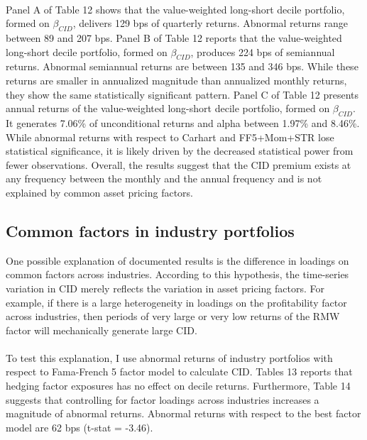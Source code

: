 \documentclass[12pt]{article}
\begin{document}
\paragraph{}
Panel A of Table 12 shows that the value-weighted long-short decile portfolio, formed on $\beta_{CID}$, delivers 129 bps of quarterly returns. Abnormal returns range between 89 and 207 bps. Panel B of Table 12 reports that the value-weighted long-short decile portfolio, formed on $\beta_{CID}$, produces 224 bps of semiannual returns. Abnormal semiannual returns are between 135 and 346 bps. While these returns are smaller in annualized magnitude than annualized monthly returns, they show the same statistically significant pattern. Panel C of Table 12 presents annual returns of the value-weighted long-short decile portfolio, formed on $\beta_{CID}$. It generates 7.06\% of unconditional returns and alpha between 1.97\% and 8.46\%. While abnormal returns with respect to Carhart and FF5+Mom+STR lose statistical significance, it is likely driven by the decreased statistical power from fewer observations. Overall, the results suggest that the CID premium exists at any frequency between the monthly and the annual frequency and is not explained by common asset pricing factors.

\subsection{Common factors in industry portfolios}

One possible explanation of documented results is the difference in loadings on common factors across industries. According to this hypothesis, the time-series variation in CID merely reflects the variation in asset pricing factors. For example, if there is a large heterogeneity in loadings on the profitability factor across industries, then periods of very large or very low returns of the RMW factor will mechanically generate large CID.
\paragraph{}
To test this explanation, I use abnormal returns of industry portfolios with respect to Fama-French 5 factor model to calculate CID. Tables 13 reports that hedging factor exposures has no effect on decile returns. Furthermore, Table 14 suggests that controlling for factor loadings across industries increases a magnitude of abnormal returns. Abnormal returns with respect to the best factor model are 62 bps (t-stat = -3.46). 
\end{document}
